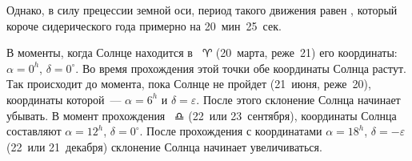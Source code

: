Однако, в силу прецессии земной оси, период такого движения равен , который короче сидерического года примерно на 20~мин~25~сек.

В моменты, когда Солнце находится в ~$\aries$  (20~марта, реже~21) его координаты: $\alpha=0^h$, $\delta=0^{\circ}$. Во время прохождения этой точки обе координаты Солнца растут. Так происходит до момента, пока Солнце не пройдет  (21~июня, реже~20), координаты которой~--- $\alpha=6^h$ и $\delta=\varepsilon$. После этого склонение Солнца начинает убывать. В момент прохождения ~$\libra$ (22~или 23~сентября), координаты Солнца составляют $\alpha=12^h$, $\delta=0^{\circ}$. После прохождения  с координатами $\alpha=18^h$, $\delta=-\varepsilon$ (22~или 21~декабря) склонение Солнца начинает увеличиваться.

